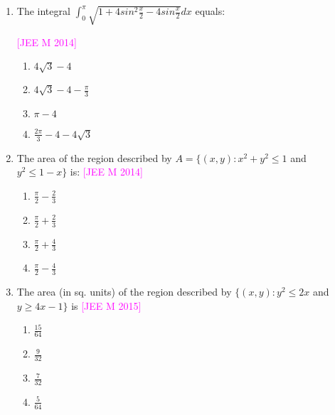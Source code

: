 \documentclass[journal,12pt,twocolumn]{IEEEtran}
\theoremstyle{remark}
\begin{document}
\begin{enumerate}[label=\textcolor{magenta}{\arabic*.}]

	\item The integral $\int_0^{\pi}\sqrt{1+4sin^2\frac{x}{2}-4sin\frac{x}{2}}dx$ equals:

		\hfill{\textcolor{magenta}{[JEE M 2014]}}

		\begin{multicols}{2}
			\begin{enumerate}[label=(\alph*)]
				\item $4\sqrt{3}-4$
				\item $4\sqrt{3}-4-\frac{\pi}{3}$
				\item $\pi-4$
				\item $\frac{2\pi}{3}-4-4\sqrt{3}$
			\end{enumerate}
		\end{multicols}


	\item The area of the region described by $A=\{(x,y):x^2+y^2\leq1$ and $y^2\leq1-x\}$ is:
		\hfill{\textcolor{magenta}{[JEE M 2014]}}

		\begin{multicols}{4}
			\begin{enumerate}[label=(\alph*)]
				\item $\frac{\pi}{2}-\frac{2}{3}$
				\item $\frac{\pi}{2}+\frac{2}{3}$
				\item $\frac{\pi}{2}+\frac{4}{3}$
				\item $\frac{\pi}{2}-\frac{4}{3}$
			\end{enumerate}
		\end{multicols}


	\item The area (in sq. units) of the region described by $\{(x,y):y^2\leq2x$ and $y\geq4x-1\}$ is
		\hfill{\textcolor{magenta}{[JEE M 2015]}}

		\begin{multicols}{4}
			\begin{enumerate}[label=(\alph*)]
				\item $\frac{15}{64}$
				\item $\frac{9}{32}$
				\item $\frac{7}{32}$
				\item $\frac{5}{64}$
			\end{enumerate}
		\end{multicols}



\end{enumerate}
\end{document}
